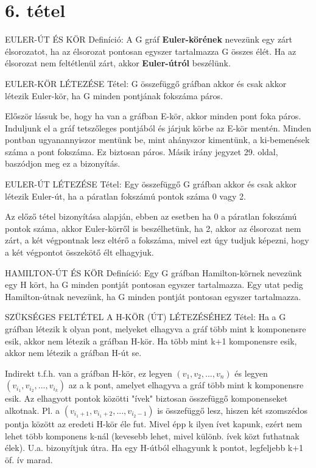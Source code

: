 \section{6. tétel}

\begin{definicio}{
EULER-ÚT ÉS KÖR Definíció}: A G gráf \textbf{Euler-körének} nevezünk egy zárt élsorozatot, ha az élsorozat pontosan egyszer tartalmazza G összes élét. Ha az élsorozat nem feltétlenül zárt, akkor \textbf{Euler-útról} beszélünk.
\end{definicio}
\begin{tetel}{
EULER-KÖR LÉTEZÉSE Tétel}: G összefüggő gráfban akkor és csak akkor létezik Euler-kör, ha G minden pontjának fokszáma páros.
\end{tetel}
\begin{leftbar}
Először lássuk be, hogy ha van a gráfban E-kör, akkor minden pont foka páros. Induljunk el a gráf tetszőleges pontjából és járjuk körbe az E-kör mentén. Minden pontban ugyanannyiszor mentünk be, mint ahányszor kimentünk, a ki-bemenések száma a pont fokszáma. Ez biztosan páros. Másik irány jegyzet 29. oldal, baszódjon meg ez a bizonyítás.
\end{leftbar}
\begin{tetel}{
EULER-ÚT LÉTEZÉSE Tétel}: Egy összefüggő G gráfban akkor és csak akkor létezik Euler-út, ha a páratlan fokszámú pontok száma 0 vagy 2.
\end{tetel}
\begin{leftbar}
Az előző tétel bizonyítása alapján, ebben az esetben ha 0 a páratlan fokszámú pontok száma, akkor Euler-körről is beszélhetünk, ha 2, akkor az élsorozat nem zárt, a két végpontnak lesz eltérő a fokszáma, mivel ezt úgy tudjuk képezni, hogy a két végpontot összekötő élt elhagyjuk.
\end{leftbar}
\begin{definicio}{
HAMILTON-ÚT ÉS KÖR Definíció}: Egy G gráfban Hamilton-körnek nevezünk egy H kört, ha G minden pontját pontosan egyszer tartalmazza. Egy utat pedig Hamilton-útnak nevezünk, ha G minden pontját pontosan egyszer tartalmazza.
\end{definicio}
\begin{tetel}{
SZÜKSÉGES FELTÉTEL A H-KÖR (ÚT) LÉTEZÉSÉHEZ Tétel}: Ha a G gráfban létezik k olyan pont, melyeket elhagyva a gráf több mint k komponensre esik, akkor nem létezik a gráfban H-kör. Ha több mint k+1 komponensre esik, akkor nem létezik a gráfban H-út se.
\end{tetel}
\begin{leftbar}
Indirekt t.f.h. van a gráfban H-kör, ez legyen $(v_1, v_2,..., v_n)$ és legyen $(v_{i_1}, v_{i_2},...,v_{i_k})$ az a k pont, amelyet elhagyva a gráf több mint k komponensre esik. Az elhagyott pontok közötti "ívek" biztosan összefüggő komponenseket alkotnak. Pl. a $(v_{i_{1}+1}, v_{i_{1}+2},..., v_{i_{2}-1})$ is összefüggő lesz, hiszen két szomszédos pontja között az eredeti H-kör éle fut. Mivel épp k ilyen ívet kapunk, ezért nem lehet több komponens k-nál (kevesebb lehet, mivel különb. ívek közt futhatnak élek). U.a. bizonyítjuk útra. Ha egy H-útból elhagyunk k pontot, legfeljebb k+1 öf. ív marad.
\end{leftbar}
